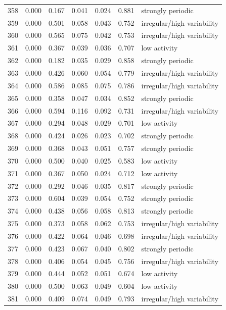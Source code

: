 \begin{longtable}{lrrrrrl}
358 & 0.000 & 0.167 & 0.041 & 0.024 & 0.881 & strongly periodic \\
359 & 0.000 & 0.501 & 0.058 & 0.043 & 0.752 & irregular/high variability \\
360 & 0.000 & 0.565 & 0.075 & 0.042 & 0.753 & irregular/high variability \\
361 & 0.000 & 0.367 & 0.039 & 0.036 & 0.707 & low activity \\
362 & 0.000 & 0.182 & 0.035 & 0.029 & 0.858 & strongly periodic \\
363 & 0.000 & 0.426 & 0.060 & 0.054 & 0.779 & irregular/high variability \\
364 & 0.000 & 0.586 & 0.085 & 0.075 & 0.786 & irregular/high variability \\
365 & 0.000 & 0.358 & 0.047 & 0.034 & 0.852 & strongly periodic \\
366 & 0.000 & 0.594 & 0.116 & 0.092 & 0.731 & irregular/high variability \\
367 & 0.000 & 0.294 & 0.048 & 0.029 & 0.701 & low activity \\
368 & 0.000 & 0.424 & 0.026 & 0.023 & 0.702 & strongly periodic \\
369 & 0.000 & 0.368 & 0.043 & 0.051 & 0.757 & strongly periodic \\
370 & 0.000 & 0.500 & 0.040 & 0.025 & 0.583 & low activity \\
371 & 0.000 & 0.367 & 0.050 & 0.024 & 0.712 & low activity \\
372 & 0.000 & 0.292 & 0.046 & 0.035 & 0.817 & strongly periodic \\
373 & 0.000 & 0.604 & 0.039 & 0.054 & 0.752 & strongly periodic \\
374 & 0.000 & 0.438 & 0.056 & 0.058 & 0.813 & strongly periodic \\
375 & 0.000 & 0.373 & 0.058 & 0.062 & 0.753 & irregular/high variability \\
376 & 0.000 & 0.422 & 0.064 & 0.046 & 0.698 & irregular/high variability \\
377 & 0.000 & 0.423 & 0.067 & 0.040 & 0.802 & strongly periodic \\
378 & 0.000 & 0.406 & 0.054 & 0.045 & 0.756 & irregular/high variability \\
379 & 0.000 & 0.444 & 0.052 & 0.051 & 0.674 & low activity \\
380 & 0.000 & 0.500 & 0.063 & 0.049 & 0.604 & low activity \\
381 & 0.000 & 0.409 & 0.074 & 0.049 & 0.793 & irregular/high variability \\

\end{longtable}
